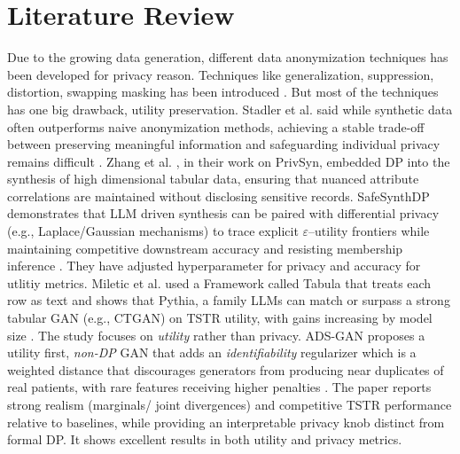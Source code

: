 \documentclass[master,proposal,extern,palatino]{rgseThesis}
\begin{document}
\section{Literature Review}

Due to the growing data generation, different data anonymization techniques has been developed for privacy reason. Techniques like generalization, suppression, distortion, swapping masking has been introduced \cite{anonymization}. But most of the techniques has one big drawback, utility preservation. Stadler et al. said while synthetic data often outperforms naive anonymization methods, achieving a stable trade-off between preserving meaningful information and safeguarding individual privacy remains difficult \cite{stadler2022synthetic}. Zhang et al. \cite{privsyn2021}, in their work on PrivSyn, embedded DP into the synthesis of high dimensional tabular data, ensuring that nuanced attribute correlations are maintained without disclosing sensitive records. SafeSynthDP demonstrates that LLM driven synthesis can be paired with differential privacy (e.g., Laplace/Gaussian mechanisms) to trace explicit $\varepsilon$–utility frontiers while maintaining competitive downstream accuracy and resisting membership inference \cite{Nahid2024}. They have adjusted hyperparameter for privacy and accuracy for utlitiy metrics. 
\newline
Miletic et al. \cite{Miletic2024} used a Framework called Tabula that treats each row as text and shows that Pythia, a family LLMs can match or surpass a strong tabular GAN (e.g., CTGAN) on TSTR utility, with gains increasing by model size \cite{Miletic2024}. The study focuses on \emph{utility} rather than privacy.
\newline
ADS-GAN proposes a utility first, \emph{non-DP} GAN that adds an \emph{identifiability} regularizer which is a weighted distance that discourages generators from producing near duplicates of real patients, with rare features receiving higher penalties \cite{ADSGAN2020}. The paper reports strong realism (marginals/ joint divergences) and competitive TSTR performance relative to baselines, while providing an interpretable privacy knob distinct from formal DP. It shows excellent results in both utility and privacy metrics.
\newline
\end{document}
